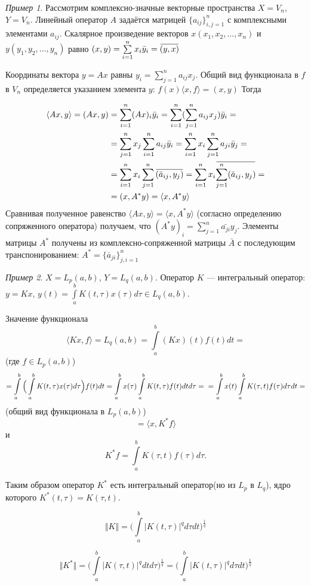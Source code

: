 \documentclass[12pt,a4paper,titlepage,oneside]{book}
\newcommand{\overbar}[1]{\mkern 1.5mu\overline{\mkern-1.5mu#1\mkern-1.5mu}\mkern 1.5mu}
\theoremstyle{definition}
\theoremstyle{plain}
\theoremstyle{break}
\theoremstyle{remark}
\theoremstyle{remark}
\newtheorem*{example}{Пример}
\theoremstyle{remark}
\theoremstyle{remark}
\theoremstyle{plain}
\theoremstyle{plain}
\begin{document}
\begin{example}
Рассмотрим комплексно-значные векторные пространства $X=V_n$, $Y=V_n$. Линейный оператор $A$ задаётся матрицей $\lbrace a_{ij} \rbrace_{i,j=1}^n$ с комплексными элементами $a_{ij}$. Скалярное произведение векторов $x(x_1,x_2,\ldots,x_n)$ и $y(y_1,y_2,\ldots,y_n)$ равно $(x,y) = \sum\limits_{i=1}^n x_i \bar{y}_i = \overbar{(y,x)}$

Координаты вектора $y=Ax$ равны $y_i = \sum\limits_{j=1}^n a_{ij} x_j$. Общий вид функционала в $f$ в $V_n$ определяется указанием элемента $y$:
$f(x) \langle x,f \rangle = (x,y)$
Тогда

\begin{align*}
\langle Ax,y \rangle = (Ax,y) &= \sum\limits_{i=1}^n (Ax)_i \bar{y}_i = \sum\limits_{i=1}^n (\sum\limits_{j=1}^n a_{ij}x_j)\bar{y}_i =\\
&= \sum\limits_{j=1}^n x_j \sum\limits_{i=1}^n a_{ij}\bar{y}_i = \sum\limits_{i=1}^n x_i \sum\limits_{j=1}^n a_{ji}\bar{y}_j =\\
&= \sum\limits_{i=1}^n x_i \sum\limits_{j=1}^n \overbar{(\bar{a}_{ij},y_j)} = \sum\limits_{i=1}^n x_i \overbar{\sum\limits_{j=1}^n(\bar{a}_{ij} ,y_j)} =\\
&= (x,A^{*}y)=\langle x, A^{*}y \rangle
\end{align*} 
Сравнивая полученное равенство $\langle Ax,y \rangle = \langle x, A^{*}y \rangle$ (согласно определению сопряженного оператора) получаем, что
$(A^{*}y)_i = \sum\limits_{j=1}^n \bar{a_{ji}} y_j$.
Элементы матрицы $A^{*}$ получены из комплексно-сопряженной матрицы $\bar{A}$ с последующим транспонированием: $A^{*}=\{\bar{a}_{ji}\}_{j,i=1}^n$
\end{example}

\begin{example}
$X=L_p(a,b)$, $Y=L_q(a,b)$. Оператор $K$ --- интегральный оператор: $y=Kx$, $y(t)=\int\limits_a^b K(t,\tau)x(\tau)d\tau \in L_q(a,b)$.

Значение функционала
$$\langle Kx,f \rangle = L_q(a,b)=\int\limits_a^b (Kx)(t)f(t)dt=$$ 
(где $f \in L_p(a,b)$)
$$= \int\limits_a^b \Big( \int\limits_a^b K(t,\tau)x(\tau)d\tau \Big) f(t)dt = \int\limits_a^b x(\tau) \int\limits_a^b K(t,\tau)f(t)dt d\tau =\\= \int\limits_a^b x(t) \int\limits_a^b K(\tau,t)f(\tau)d\tau dt =$$
(общий вид функционала в $L_p(a,b)$)
$$= \langle x,K^{*}f \rangle$$
и
$$K^{*}f=\int\limits_a^b K(\tau, t)f(\tau)d\tau.$$

Таким образом оператор $K^{*}$ есть интегральный оператор(но из $L_p$ в $L_q$), ядро которого $K^{*}(t,\tau)=K(\tau,t)$.

$$\Vert K \Vert = \Big( \displaystyle\int\limits_a^b \lvert K(t,\tau) \rvert^q d\tau dt  \Big)^{\frac{1}{q}}$$

$$\Vert K^{*} \Vert =  \Big( \displaystyle\int\limits_a^b \lvert K(\tau, t) \rvert^q dt d\tau  \Big)^{\frac{1}{q}} =  \Big( \displaystyle\int\limits_a^b \lvert K(t,\tau) \rvert^q d\tau dt  \Big)^{\frac{1}{q}}$$
\end{example}
\end{document}
